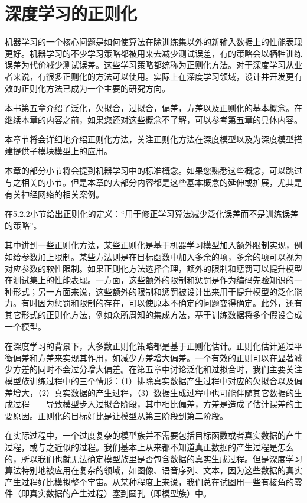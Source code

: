 \chapter{深度学习的正则化}
\label{chap:7}
机器学习的一个核心问题是如何使算法在除训练集以外的新输入数据上的性能表现更好。机器学习的不少学习策略都被用来去减少测试误差，有的策略会以牺牲训练误差为代价减少测试误差。这些学习策略都统称为正则化方法。对于深度学习从业者来说，有很多正则化的方法可以使用。实际上在深度学习领域，设计并开发更有效的正则化方法已成为一个主要的研究方向。

本书第五章介绍了泛化，欠拟合，过拟合，偏差，方差以及正则化的基本概念。在继续本章的内容之前，如果您还对这些概念不了解，可以参考第五章的具体内容。

本章节将会详细地介绍正则化方法，关注正则化方法在深度模型以及为深度模型搭建提供子模块模型上的应用。

本章的部分小节将会提到机器学习中的标准概念。如果您熟悉这些概念，可以跳过与之相关的小节。但是本章的大部分内容都是这些基本概念的延伸或扩展，尤其是有关神经网络的相关案例。

在5.2.2小节给出正则化的定义：“用于修正学习算法减少泛化误差而不是训练误差的策略”。

其中讲到一些正则化方法，某些正则化是基于机器学习模型加入额外限制实现，例如给参数加上限制。某些方法则是在目标函数中加入多余的项，多余的项可以视为对应参数的软性限制。如果正则化方法选择合理，额外的限制和惩罚可以提升模型在测试集上的性能表现。一方面，这些额外的限制和惩罚是作为编码先验知识的一种形式；另一方面来说，这些额外的限制和惩罚被设计出来用于提升模型的泛化能力。有时因为惩罚和限制的存在，可以使原本不确定的问题变得确定。此外，还有其它形式的正则化方法，例如众所周知的集成方法，基于训练数据将多个假设合成一个模型。

在深度学习的背景下，大多数正则化策略都是基于正则化估计。正则化估计通过平衡偏差和方差来实现其作用，如减少方差增大偏差。一个有效的正则可以在显著减少方差的同时不会过分增大偏差。在第五章中讨论泛化和过拟合时，我们主要关注模型族训练过程中的三个情形：（1）排除真实数据产生过程中对应的欠拟合以及偏差增大，（2）真实数据的产生过程，（3）数据生成过程中也可能伴随其它数据的生成过程——导致模型步入过拟合阶段，其中相比偏差，方差是造成了估计误差的主要原因。正则化的目标好比是让模型从第三阶段到第二阶段。

在实际过程中，一个过度复杂的模型族并不需要包括目标函数或者真实数据的产生过程，或与之近似的过程。我们基本上从来都不知道真正数据的产生过程是怎么的，所以我们也就无法确定模型族里是否包含数据的真实生成过程。但是深度学习算法特别地被应用在复杂的领域，如图像、语音序列、文本，因为这些数据的真实产生过程好比模拟整个宇宙。从某种程度上来说，我们总在试图用一些有棱角的零件（即真实数据的产生过程）塞到圆孔（即模型族）中。

